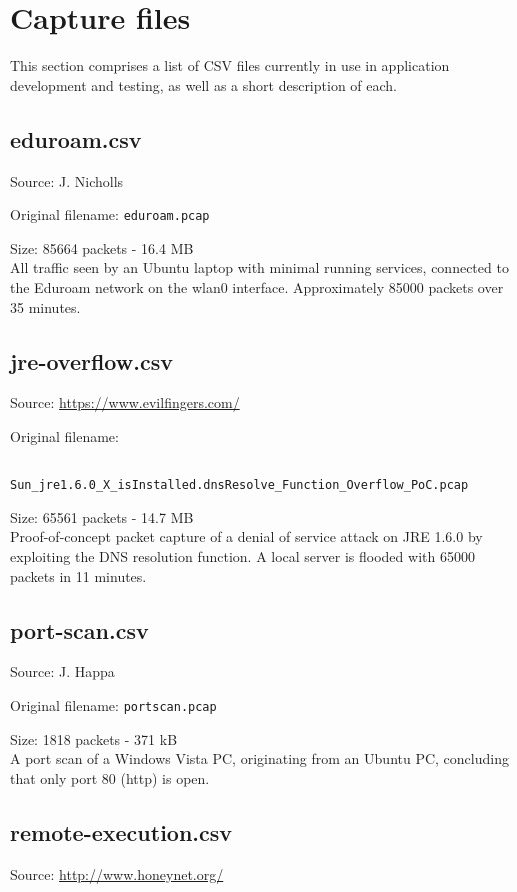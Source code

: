 \documentclass[12pt,a4paper]{article}
\newcommand{\dbl}{\\[\baselineskip]}
\begin{document}
    \pagebreak

    \section{Capture files}
        This section comprises a list of CSV files currently in use in
        application development and testing, as well as a short
        description of each.

        \subsection{eduroam.csv}
            Source: J. Nicholls

            Original filename: \verb!eduroam.pcap!

            Size: 85664 packets - 16.4 MB \dbl
            All traffic seen by an Ubuntu laptop with minimal running
            services, connected to the Eduroam network on the wlan0
            interface. Approximately 85000 packets over 35 minutes.

        \subsection{jre-overflow.csv}
            Source: \url{https://www.evilfingers.com/}

            Original filename:

            \verb!       Sun_jre1.6.0_X_isInstalled.dnsResolve_Function_Overflow_PoC.pcap!

            Size: 65561 packets - 14.7 MB \dbl
            Proof-of-concept packet capture of a denial of service
            attack on JRE 1.6.0 by exploiting the DNS resolution
            function. A local server is flooded with 65000 packets in
            11 minutes.

        \subsection{port-scan.csv}
            Source: J. Happa

            Original filename: \verb!portscan.pcap!

            Size: 1818 packets - 371 kB \dbl
            A port scan of a Windows Vista PC, originating from an
            Ubuntu PC, concluding that only port 80 (http) is open.

        \subsection{remote-execution.csv}
            Source: \url{http://www.honeynet.org/}
\end{document}
